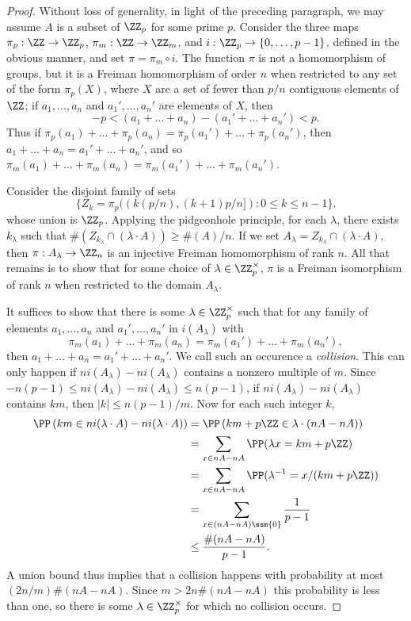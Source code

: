 \begin{proof}
    Without loss of generality, in light of the preceding paragraph, we may assume $A$ is a subset of $\ZZ_p$ for some prime $p$. Consider the three maps $\pi_p: \ZZ \to \ZZ_p$, $\pi_m: \ZZ \to \ZZ_m$, and $i: \ZZ_p \to \{ 0, \dots, p-1 \}$, defined in the obvious manner, and set $\pi = \pi_m \circ i$. The function $\pi$ is not a homomorphism of groups, but it is a Freiman homomorphism of order $n$ when restricted to any set of the form $\pi_p(X)$, where $X$ are a set of fewer than $p/n$ contiguous elements of $\ZZ$; if $a_1,\dots,a_n$ and $a_1',\dots,a_n'$ are elements of $X$, then
    \[ -p < (a_1 + \dots + a_n) - (a_1' + \dots + a_n') < p. \]
    Thus if $\pi_p(a_1) + \dots + \pi_p(a_n) = \pi_p(a_1') + \dots + \pi_p(a_n')$, then $a_1 + \dots + a_n = a_1' + \dots + a_n'$, and so $\pi_m(a_1) + \dots + \pi_m(a_n) = \pi_m(a_1') + \dots + \pi_m(a_n')$.

    Consider the disjoint family of sets
    \[ \{ Z_k = \pi_p((k(p/n),(k+1)p/n]) : 0 \leq k \leq n-1 \}. \]
    whose union is $\ZZ_p$. Applying the pidgeonhole principle, for each $\lambda$, there exists $k_\lambda$ such that $\#(Z_{k_\lambda} \cap (\lambda \cdot A)) \geq \#(A) / n$. If we set $A_\lambda = Z_{k_\lambda} \cap (\lambda \cdot A)$, then $\pi: A_\lambda \to \ZZ_n$ is an injective Freiman homomorphism of rank $n$. All that remains is to show that for some choice of $\lambda \in \ZZ_p^\times$, $\pi$ is a Freiman isomorphism of rank $n$ when restricted to the domain $A_\lambda$.

    It suffices to show that there is some $\lambda \in \ZZ_p^\times$ such that for any family of elements $a_1,\dots,a_n$ and $a_1',\dots,a_n'$ in $i(A_\lambda)$ with
    \[ \pi_m(a_1) + \dots + \pi_m(a_n) = \pi_m(a_1') + \dots + \pi_m(a_n'), \]
    then $a_1 + \dots + a_n = a_1' + \dots + a_n'$. We call such an occurence a \emph{collision}. This can only happen if $n i(A_\lambda) - n i(A_\lambda)$ contains a nonzero multiple of $m$. Since $-n(p-1) \leq n i(A_\lambda) - n i(A_\lambda) \leq n(p-1)$, if $n i(A_\lambda) - n i(A_\lambda)$ contains $km$, then $|k| \leq n(p-1)/m$. Now for each such integer $k$,
    \begin{align*}
        \PP \left( km \in n i(\lambda \cdot A) - n i(\lambda \cdot A) \right) &= \PP \left( km + p \ZZ \in \lambda \cdot (nA - nA) \right)\\
        &= \sum_{x \in nA - nA} \PP(\lambda x = km + p \ZZ)\\
        &= \sum_{x \in nA - nA} \PP(\lambda^{-1} = x / (km + p \ZZ))\\
        &= \sum_{x \in (nA - nA) \ssm \{ 0 \}} \frac{1}{p-1}\\
        &\leq \frac{\#(nA - nA)}{p - 1}.
    \end{align*}
    A union bound thus implies that a collision happens with probability at most $(2n/m) \#(nA - nA)$. Since $m > 2n \#(nA - nA)$ this probability is less than one, so there is some $\lambda \in \ZZ_p^\times$ for which no collision occurs.
\end{proof}

